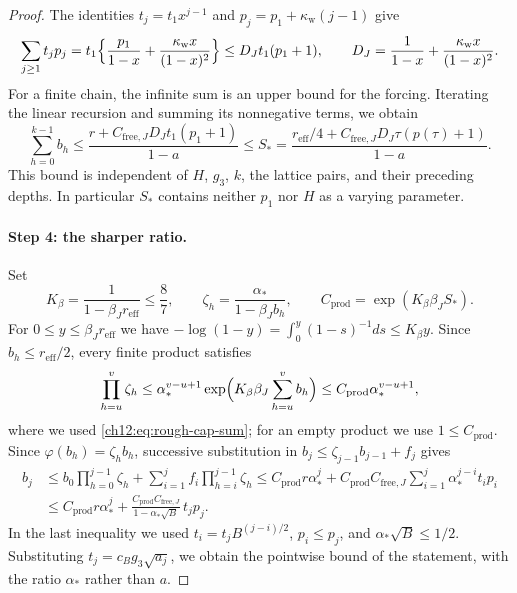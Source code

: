 \begin{proof}
The identities $t_j=t_1x^{j-1}$ and $p_j=p_1+\kappa_{\mathrm w}(j-1)$ give
\begin{equation}
 \sum_{j\ge1}t_jp_j=t_1\Bigl\{\frac{p_1}{1-x}+\frac{\kappa_{\mathrm w}x}{(1-x)^2}\Bigr\}\le D_Jt_1(p_1+1),\qquad
 D_J=\frac1{1-x}+\frac{\kappa_{\mathrm w}x}{(1-x)^2}. \label{ch12:eq:forcing-sum}
\end{equation}
For a finite chain, the infinite sum is an upper bound for the forcing. Iterating the linear recursion and summing its nonnegative terms, we obtain
\begin{equation}
 \sum_{h=0}^{k-1}b_h\le\frac{r+C_{\mathrm{free},J}D_Jt_1(p_1+1)}{1-a}\le S_*=\frac{r_{\mathrm{eff}}/4+C_{\mathrm{free},J}D_J\tau(p(\tau)+1)}{1-a}. \label{ch12:eq:rough-cap-sum}
\end{equation}
This bound is independent of $H$, $g_3$, $k$, the lattice pairs, and their preceding depths. In particular $S_*$ contains neither $p_1$ nor $H$ as a varying parameter.

\paragraph{Step 4: the sharper ratio.}
Set
\[
 K_\beta=\frac1{1-\beta_Jr_{\mathrm{eff}}}\le\frac87,\qquad
 \zeta_h=\frac{\alpha_*}{1-\beta_Jb_h},\qquad
 C_{\mathrm{prod}}=\exp(K_\beta\beta_JS_*).
\]
For $0\le y\le\beta_Jr_{\mathrm{eff}}$ we have $-\log(1-y)=\int_0^y(1-s)^{-1}ds\le K_\beta y$. Since $b_h\le r_{\mathrm{eff}}/2$, every finite product satisfies
\begin{equation}
 \prod_{h=u}^v\zeta_h\le\alpha_*^{v-u+1}\exp\Bigl(K_\beta\beta_J\sum_{h=u}^vb_h\Bigr)\le C_{\mathrm{prod}}\alpha_*^{v-u+1}, \label{ch12:eq:center-products}
\end{equation}
where we used \eqref{ch12:eq:rough-cap-sum}; for an empty product we use $1\le C_{\mathrm{prod}}$. Since $\varphi(b_h)=\zeta_hb_h$, successive substitution in $b_j\le\zeta_{j-1}b_{j-1}+f_j$ gives
\begin{equation}
 \begin{split}
 b_j&\le b_0\prod_{h=0}^{j-1}\zeta_h+\sum_{i=1}^jf_i\prod_{h=i}^{j-1}\zeta_h
 \le C_{\mathrm{prod}}r\alpha_*^j+C_{\mathrm{prod}}C_{\mathrm{free},J}\sum_{i=1}^j\alpha_*^{j-i}t_ip_i\\
 &\le C_{\mathrm{prod}}r\alpha_*^j+\frac{C_{\mathrm{prod}}C_{\mathrm{free},J}}{1-\alpha_*\sqrt B}\,t_jp_j .
 \end{split}\label{ch12:eq:sharp-forced-cap}
\end{equation}
In the last inequality we used $t_i=t_jB^{(j-i)/2}$, $p_i\le p_j$, and $\alpha_*\sqrt B\le1/2$. Substituting $t_j=c_Bg_3\sqrt{a_j}$, we obtain the pointwise bound of the statement, with the ratio $\alpha_*$ rather than $a$.


\end{proof}
